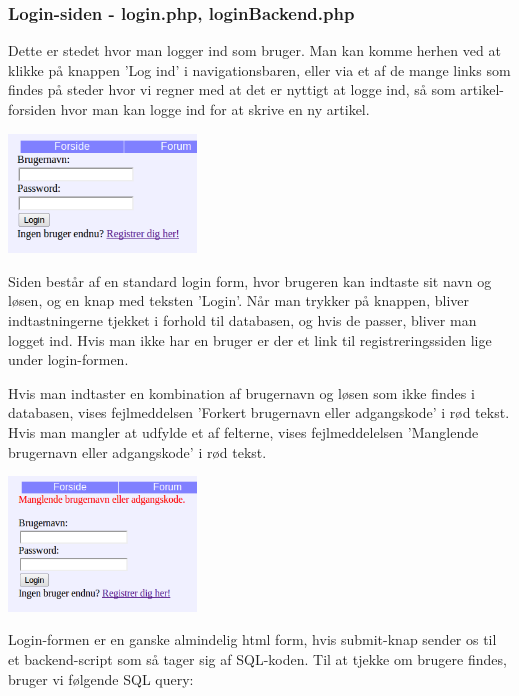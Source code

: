 \documentclass{article}
\begin{document}
\subsubsection[Login-siden]{Login-siden - login.php, loginBackend.php}
Dette er stedet hvor man logger ind som bruger. Man kan komme herhen ved at klikke på knappen 'Log ind' i navigationsbaren, eller via et af de mange links som findes på steder hvor vi regner med at det er nyttigt at logge ind, så som artikel-forsiden hvor man kan logge ind for at skrive en ny artikel.

\begin{center}
\includegraphics[width=50mm]{mi07.png}
\end{center}

Siden består af en standard login form, hvor brugeren kan indtaste sit navn og løsen, og en knap med teksten 'Login'. Når man trykker på knappen, bliver indtastningerne tjekket i forhold til databasen, og hvis de passer, bliver man logget ind. Hvis man ikke har en bruger er der et link til registreringssiden lige under login-formen.

Hvis man indtaster en kombination af brugernavn og løsen som ikke findes i databasen, vises fejlmeddelsen 'Forkert brugernavn eller adgangskode' i rød tekst. Hvis man mangler at udfylde et af felterne, vises fejlmeddelelsen 'Manglende brugernavn eller adgangskode' i rød tekst. 

\begin{center}
\includegraphics[width=50mm]{mi09.png}
\end{center}

Login-formen er en ganske almindelig html form, hvis submit-knap sender os til et backend-script som så tager sig af SQL-koden. Til at tjekke om brugere findes, bruger vi følgende SQL query:
\end{document}
